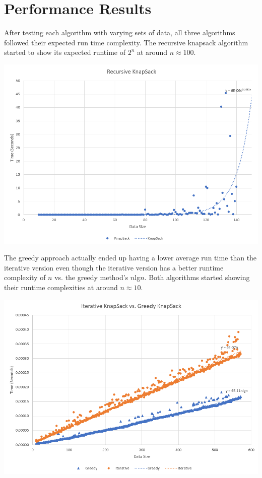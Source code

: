 \documentclass[a4paper]{article}
\begin{document}
    
    \section{Performance Results} 
    After testing each algorithm with varying sets of data, all three algorithms 
    followed their expected run time complexity. The recursive knapsack algorithm 
    started to show its expected runtime of $2^{n}$ at around $n \approx 100$. 
    \begin{center}
      \includegraphics[scale=0.6]{1} \\
    \end{center}

    The greedy approach actually ended up having a lower average run time than the
    iterative version even though the iterative version has a better runtime complexity
    of $n$ vs. the greedy method's $n$lg$n$. Both algorithms started showing their 
    runtime complexities at around $n \approx 10$.
    \begin{center}
      \includegraphics[scale=0.6]{2} \\
    \end{center}
\end{document}
